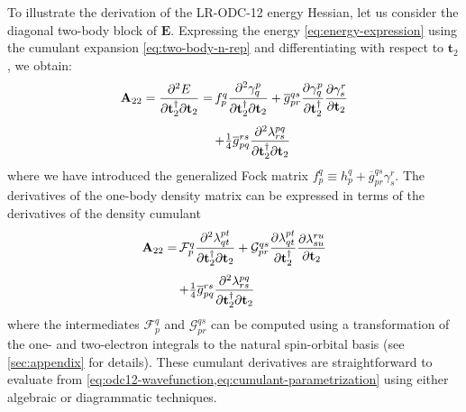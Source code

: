 To illustrate the derivation of the LR-ODC-12 energy Hessian, let us consider
the diagonal two-body block of \(\mathbf{E}\).
Expressing the energy \eqref{eq:energy-expression} using the cumulant expansion
\eqref{eq:two-body-n-rep} and differentiating with respect to $\mathbf{t}_2$, we
obtain:
\begin{equation}
    \label{eq:odc12-hessian-initial-form}
    \begin{array}{r@{\,}l}
        \mathbf{A}_{22}
        =
        \dfrac{\partial^2 E}{%
            \partial\mathbf{t}_2^\dagger
            \partial\mathbf{t}_2
        }
        =
        &
        f_p^q
        \dfrac{\partial^2 \gamma^p_q}{%
            \partial\mathbf{t}_2^\dagger
            \partial\mathbf{t}_2
        }
        +
        \overline{g}_{pr}^{qs}
        \dfrac{\partial \gamma^p_q}{\partial\mathbf{t}_2^\dagger}
        \dfrac{\partial \gamma^r_s}{\partial\mathbf{t}_2}
        \\[15pt]
        &
        +
        \tfrac{1}{4}
        \overline{g}_{pq}^{rs}
        \dfrac{\partial^2 \lambda^{pq}_{rs}}{%
            \partial\mathbf{t}_2^\dagger
            \partial\mathbf{t}_2
        }
    \end{array}
\end{equation}
where we have introduced the generalized Fock matrix
\(
    f_p^q
    \equiv
    h_p^q
    +
    \overline{g}_{pr}^{qs}
    \gamma^r_s
\).
The derivatives of the one-body density matrix can be expressed in terms of the derivatives of the density cumulant
\begin{equation}
    \begin{array}{r@{\,}l}
    \label{eq:a22_odc12}
	\mathbf{A}_{22}
        =
        &
        \mathcal{F}_p^q
        \dfrac{\partial^2 \lambda^{pt}_{qt}}{%
            \partial\mathbf{t}_2^\dagger
            \partial\mathbf{t}_2
        }
        +
        \mathcal{G}_{pr}^{qs}
        \dfrac{\partial \lambda^{pt}_{qt}}{\partial\mathbf{t}_2^\dagger}
        \dfrac{\partial \lambda^{ru}_{su}}{\partial\mathbf{t}_2}
        \\[15pt]
        &
        +
        \tfrac{1}{4}
        \overline{g}_{pq}^{rs}
        \dfrac{\partial^2 \lambda^{pq}_{rs}}{%
            \partial\mathbf{t}_2^\dagger
            \partial\mathbf{t}_2
        }
    \end{array}
\end{equation}
where the intermediates $\mathcal{F}_p^q$ and $\mathcal{G}_{pr}^{qs}$ can be computed using a transformation of the one- and two-electron integrals to the natural spin-orbital basis (see \cref{sec:appendix} for details).
These cumulant derivatives are straightforward to evaluate from \cref{eq:odc12-wavefunction,eq:cumulant-parametrization} using either algebraic or diagrammatic techniques.

